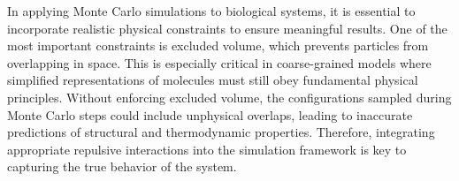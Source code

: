 \documentclass[12pt]{article}
\begin{document}
\begin{flushleft}

In applying Monte Carlo simulations to biological systems, it is essential to incorporate realistic physical constraints to ensure meaningful results. One of the most important constraints is excluded volume, which prevents particles from overlapping in space. This is especially critical in coarse-grained models where simplified representations of molecules must still obey fundamental physical principles. Without enforcing excluded volume, the configurations sampled during Monte Carlo steps could include unphysical overlaps, leading to inaccurate predictions of structural and thermodynamic properties. Therefore, integrating appropriate repulsive interactions into the simulation framework is key to capturing the true behavior of the system.






\end{flushleft}
\end{document}

